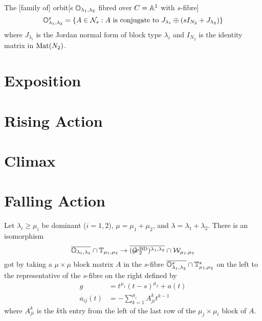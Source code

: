 \documentclass{article}
\begin{document}
The [family of] orbit[s $\OO_{\lambda_1,\lambda_2}$ fibred over $C = \AA^1$ with $s$-fibre]  
\begin{equation}
    \OO_{\lambda_1,\lambda_2}^s = \{A \in \cN_s : A \text{ is conjugate to } J_{\lambda_1}\oplus (sI_{N_2} + J_{\lambda_2})\}
\end{equation}
where $J_{\lambda_i}$ is the Jordan normal form of block type $\lambda_i$ and $I_{N_2}$ is the identity matrix in $\mat(N_2)$.
% 
\section{Exposition}

\section{Rising Action} %

\section{Climax}

\section{Falling Action} %

\begin{theorem}
    Let $\lambda_i\ge\mu_i$ be dominant ($i=1,2$), $\mu = \mu_1 +\mu_2$, and $\lambda =\lambda_1+\lambda_2$. 
    There is an isomorphism 
    \begin{equation}
        \overline{\OO_{\lambda_1,\lambda_2}}\cap\TT_{\mu_1,\mu_2} \to \overline{(\Grbd[2])^{\lambda_1,\lambda_2}}\cap \cW_{\mu_1,\mu_2}
    \end{equation}
    got by taking a $\mu\times\mu$ block matrix $A$ in the $s$-fibre $\overline{\OO_{\lambda_1,\lambda_2}^s}\cap\TT_{\mu_1,\mu_2}^s$ on the left to the representative of the $s$-fibre on the right defined by  
    \begin{equation}
        \begin{split}
            g &= t^{\mu_1} (t-s)^{\mu_2} + a(t) \\
            a_{ij}(t) &= - \sum_{k=1}^{\mu_i} A^k_{ji} t^{k-1}
        \end{split}
    \end{equation}
    where $A^k_{ji}$ is the $k$th entry from the left of the last row of the $\mu_j\times\mu_i$ block of $A$. 
\end{theorem}
\end{document}
